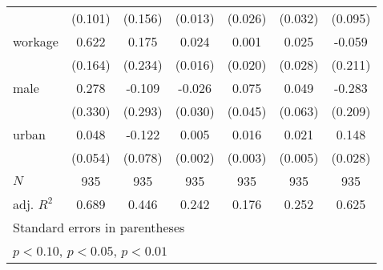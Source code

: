 {\begin{tabular}{l*{6}{c}}
            &     (0.101)         &     (0.156)         &     (0.013)         &     (0.026)         &     (0.032)         &     (0.095)         \\
[1em]
workage     &       0.622\sym{***}&       0.175         &       0.024         &       0.001         &       0.025         &      -0.059         \\
            &     (0.164)         &     (0.234)         &     (0.016)         &     (0.020)         &     (0.028)         &     (0.211)         \\
[1em]
male        &       0.278         &      -0.109         &      -0.026         &       0.075         &       0.049         &      -0.283         \\
            &     (0.330)         &     (0.293)         &     (0.030)         &     (0.045)         &     (0.063)         &     (0.209)         \\
[1em]
urban       &       0.048         &      -0.122         &       0.005\sym{*}  &       0.016\sym{***}&       0.021\sym{***}&       0.148\sym{***}\\
            &     (0.054)         &     (0.078)         &     (0.002)         &     (0.003)         &     (0.005)         &     (0.028)         \\
\hline
\(N\)       &         935         &         935         &         935         &         935         &         935         &         935         \\
adj. \(R^{2}\)&       0.689         &       0.446         &       0.242         &       0.176         &       0.252         &       0.625         \\
\hline\hline
\multicolumn{7}{l}{\footnotesize Standard errors in parentheses}\\
\multicolumn{7}{l}{\footnotesize \sym{*} \(p<0.10\), \sym{**} \(p<0.05\), \sym{***} \(p<0.01\)}\\
\end{tabular}
}
